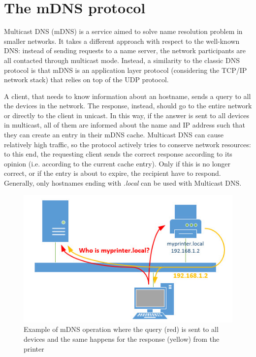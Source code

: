 \documentclass[fleqn, 11pt]{SelfArx} %
\begin{document}

\section{The mDNS protocol}
Multicast DNS (mDNS) is a service aimed to solve name resolution problem in smaller networks. It takes a different approach with respect to the well-known DNS: instead of sending requests to a name server, the network participants are all contacted through multicast mode. \newline
Instead, a similarity to the classic DNS protocol is that mDNS is an application layer protocol (considering the TCP/IP network stack) that relies on top of the UDP protocol. \newline

A client, that needs to know information about an hostname, sends a query to all the devices in the network. The response, instead, should go to the entire network or directly to the client in unicast. In this way, if the answer is sent to all devices in multicast, all of them are informed about the name and IP address such that they can create an entry in their mDNS cache. \newline
Multicast DNS can cause relatively high traffic, so the protocol actively tries to conserve network resources: to this end, the requesting client sends the correct response according to its opinion (i.e. according to the current cache entry). Only if this is no longer correct, or if the entry is about to expire, the recipient have to respond. \newline
Generally, only hostnames ending with {\it{.local}} can be used with Multicast DNS.
\begin{figure}[H]\centering
    \includegraphics[width=\linewidth]{./mdns-02.jpg}
    \caption{Example of mDNS operation where the query (red) is sent to all devices and the same happens for the response (yellow) from the printer}
    \label{fig:msdns-1}
\end{figure}
\end{document}
